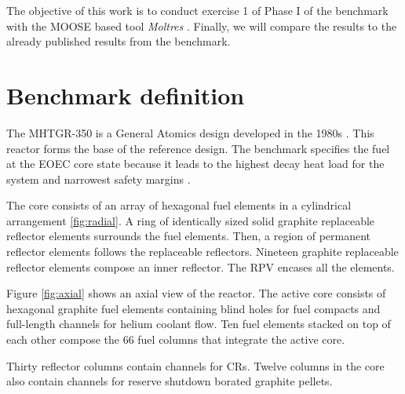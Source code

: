 \documentclass{anstrans}
\begin{document}
The objective of this work is to conduct exercise 1 of Phase I of the benchmark with the \gls{MOOSE} \cite{gaston_physics-based_2015} based tool \textit{Moltres} \cite{lindsay_introduction_2018}.
Finally, we will compare the results to the already published results from the benchmark.

\section{Benchmark definition}

The MHTGR-350 is a General Atomics design developed in the 1980s \cite{silady_licensing_1988}.
This reactor forms the base of the reference design.
The benchmark specifies the fuel at the \gls{EOEC} core state because it leads to the highest decay heat load for the system and narrowest safety margins \cite{oecd_nea_benchmark_2017}.

The core consists of an array of hexagonal fuel elements in a cylindrical arrangement \ref{fig:radial}.
A ring of identically sized solid graphite replaceable reflector elements surrounds the fuel elements.
Then, a region of permanent reflector elements follows the replaceable reflectors.
Nineteen graphite replaceable reflector elements compose an inner reflector.
The RPV encases all the elements.

Figure \ref{fig:axial} shows an axial view of the reactor.
The active core consists of hexagonal graphite fuel elements containing blind holes for fuel compacts and full-length channels for helium coolant flow.
Ten fuel elements stacked on top of each other compose the 66 fuel columns that integrate the active core.

Thirty reflector columns contain channels for \glspl{CR}.
Twelve columns in the core also contain channels for reserve shutdown borated graphite pellets.
\end{document}
